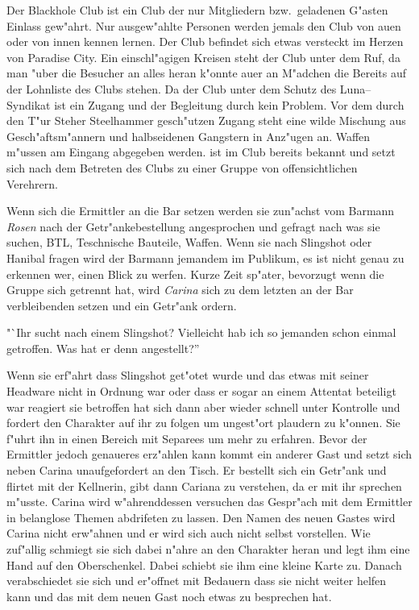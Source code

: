 
Der Blackhole Club ist ein Club der nur Mitgliedern bzw.~geladenen G"asten Einlass gew"ahrt. Nur ausgew"ahlte Personen werden jemals den Club von au\3en oder von innen kennen lernen. Der Club befindet sich etwas versteckt im Herzen von Paradise City. Ein einschl"agigen Kreisen steht der Club unter dem Ruf, da\3 man "uber die Besucher an alles heran k"onnte au\3er an M"adchen die Bereits auf der Lohnliste des Clubs stehen. Da der Club unter dem Schutz des Luna--Syndikat ist ein Zugang und der Begleitung durch \xl{} kein Problem. Vor dem durch den T"ur Steher Steelhammer gesch"utzen Zugang steht eine wilde Mischung aus Gesch"aftsm"annern und halbseidenen Gangstern in Anz"ugen an. Waffen m"ussen am Eingang abgegeben werden. \xl{} ist im Club bereits bekannt und setzt sich nach dem Betreten des Clubs zu einer Gruppe von offensichtlichen Verehrern.

Wenn sich die Ermittler an die Bar setzen werden sie zun"achst vom Barmann \emph{Rosen} nach der Getr"ankebestellung angesprochen und gefragt nach was sie suchen, BTL, Teschnische Bauteile, Waffen. Wenn sie nach Slingshot oder Hanibal fragen wird der Barmann jemandem im Publikum, es ist nicht genau zu erkennen wer, einen Blick zu werfen. Kurze Zeit sp"ater, bevorzugt wenn die Gruppe sich getrennt hat, wird \emph{Carina} sich zu dem letzten an der Bar verbleibenden setzen und ein Getr"ank ordern.

"`Ihr sucht nach einem Slingshot? Vielleicht hab ich so jemanden schon einmal getroffen. Was hat er denn angestellt?''

Wenn sie erf"ahrt dass Slingshot get"otet wurde und das etwas mit seiner Headware nicht in Ordnung war oder dass er sogar an einem Attentat beteiligt war reagiert sie betroffen hat sich dann aber wieder schnell unter Kontrolle und fordert den Charakter auf ihr zu folgen um ungest"ort plaudern zu k"onnen. Sie f"uhrt ihn in einen Bereich mit Separees um mehr zu erfahren. Bevor der Ermittler jedoch genaueres erz"ahlen kann kommt ein anderer Gast und setzt sich neben Carina unaufgefordert an den Tisch. Er bestellt sich ein Getr"ank und flirtet mit der Kellnerin, gibt dann Cariana zu verstehen, da\3 er mit ihr sprechen m"usste. Carina wird w"ahrenddessen versuchen das Gespr"ach mit dem Ermittler in belanglose Themen abdrifeten zu lassen. Den Namen des neuen Gastes wird Carina nicht erw"ahnen und er wird sich auch nicht selbst vorstellen. Wie zuf"allig schmiegt sie sich dabei n"ahre an den Charakter heran und legt ihm eine Hand auf den Oberschenkel. Dabei schiebt sie ihm eine kleine Karte zu. Danach verabschiedet sie sich und er"offnet mit Bedauern dass sie nicht weiter helfen kann und das mit dem neuen Gast noch etwas zu besprechen hat.

